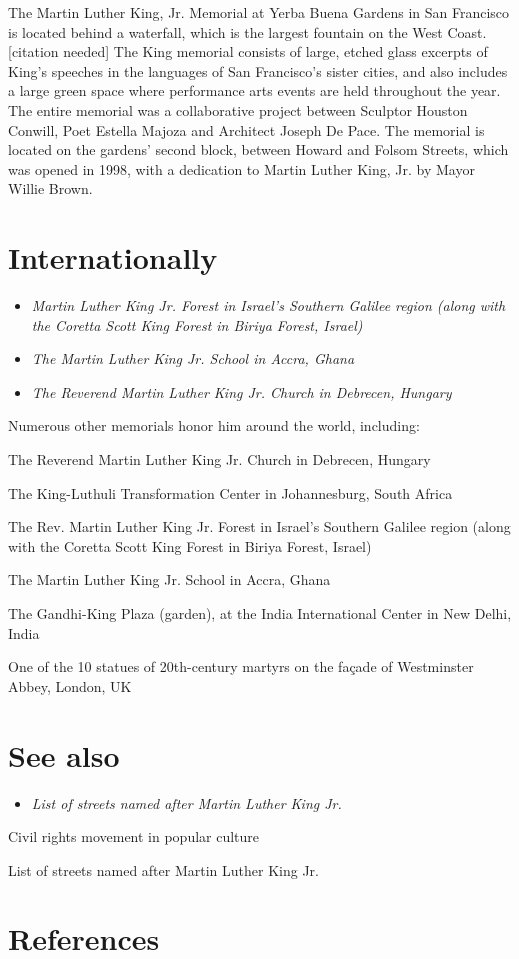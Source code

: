 The Martin Luther King, Jr. Memorial at Yerba Buena Gardens in San
Francisco is located behind a waterfall, which is the largest fountain
on the West Coast.{[}citation needed{]} The King memorial consists of
large, etched glass excerpts of King's speeches in the languages of San
Francisco's sister cities, and also includes a large green space where
performance arts events are held throughout the year. The entire
memorial was a collaborative project between Sculptor Houston Conwill,
Poet Estella Majoza and Architect Joseph De Pace. The memorial is
located on the gardens' second block, between Howard and Folsom Streets,
which was opened in 1998, with a dedication to Martin Luther King, Jr.
by Mayor Willie Brown.

\section{Internationally}\label{internationally}

\begin{itemize}
\item
  \emph{Martin Luther King Jr. Forest in Israel's Southern Galilee
  region (along with the Coretta Scott King Forest in Biriya Forest,
  Israel)}
\item
  \emph{The Martin Luther King Jr. School in Accra, Ghana}
\item
  \emph{The Reverend Martin Luther King Jr. Church in Debrecen, Hungary}
\end{itemize}

Numerous other memorials honor him around the world, including:

The Reverend Martin Luther King Jr. Church in Debrecen, Hungary

The King-Luthuli Transformation Center in Johannesburg, South Africa

The Rev. Martin Luther King Jr. Forest in Israel's Southern Galilee
region (along with the Coretta Scott King Forest in Biriya Forest,
Israel)

The Martin Luther King Jr. School in Accra, Ghana

The Gandhi-King Plaza (garden), at the India International Center in New
Delhi, India

One of the 10 statues of 20th-century martyrs on the façade of
Westminster Abbey, London, UK

\section{See also}\label{see-also}

\begin{itemize}
\item
  \emph{List of streets named after Martin Luther King Jr.}
\end{itemize}

Civil rights movement in popular culture

List of streets named after Martin Luther King Jr.

\section{References}\label{references}
